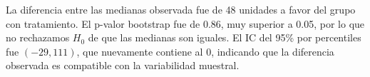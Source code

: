 \documentclass[paper=letter, fontsize=11pt, draft=false]{scrartcl}\usepackage[]{graphicx}\usepackage[]{xcolor}
\numberwithin{equation}{problemcounter} %
\numberwithin{figure}{problemcounter} %
\numberwithin{table}{problemcounter} %
\numberwithin{subsection}{problemcounter}
\begin{document}
La diferencia entre las medianas observada fue de 48 unidades a favor del grupo con tratamiento. El p-valor bootstrap fue de 0.86, muy superior a 0.05, por lo que no rechazamos \(H_0\) de que las medianas son iguales. El IC del 95\% por percentiles fue \((-29, 111)\), que nuevamente contiene al 0, indicando que la diferencia observada es compatible con la variabilidad muestral.


\newpage

















































\end{document}
